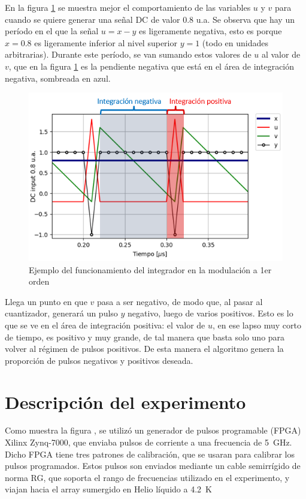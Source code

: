 \documentclass[twoside]{article}
\begin{document}
\begin{multicols}{2}
En la figura \ref{fig:integrador} se muestra mejor el comportamiento de las variables $u$ y $v$ para cuando se quiere generar una señal DC de valor 0.8 u.a. Se observa que hay un período en el que la señal $u=x-y$ es ligeramente negativa, esto es porque $x=0.8$ es ligeramente inferior al nivel superior $y=1$ (todo en unidades arbitrarias). Durante este período, se van sumando estos valores de $u$ al valor de $v$, que en la figura \ref{fig:integrador} es la pendiente negativa que está en el área de integración negativa, sombreada en azul.


\begin{figure}[H]
\centering
\includegraphics[width=\linewidth]{figuras/integracion.png}
\caption{Ejemplo del funcionamiento del integrador en la modulación a 1er orden}
\label{fig:integrador}
\end{figure}

Llega un punto en que $v$ pasa a ser negativo, de modo que, al pasar al cuantizador, generará un pulso $y$ negativo, luego de varios positivos. Esto es lo que se ve en el área de integración positiva: el valor de $u$, en ese lapso muy corto de tiempo, es positivo y muy grande, de tal manera que basta solo uno para volver al régimen de pulsos positivos. De esta manera el algoritmo genera la proporción de pulsos negativos y positivos deseada.

\section{Descripción del experimento}

Como muestra la figura , se utilizó un generador de pulsos programable (FPGA) Xilinx Zynq-7000, que enviaba pulsos de corriente a una frecuencia de \SI{5}{\giga\hertz}. Dicho FPGA tiene tres patrones de calibración, que se usaran para calibrar los pulsos programados. Estos pulsos son enviados mediante un cable semirrígido de norma RG{}, que soporta el rango de frecuencias utilizado en el experimento, y viajan hacia el array sumergido en Helio líquido a \SI{4.2}{\kelvin}


\end{multicols}
\end{document}
